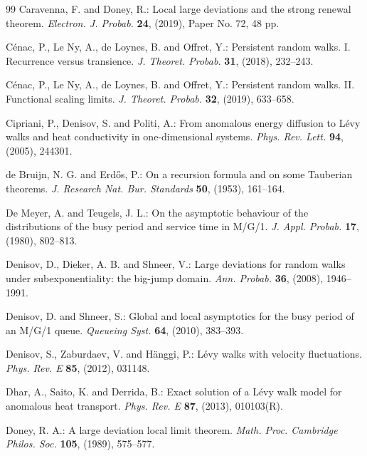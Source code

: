\documentclass[EJP,preprint]{ejpecp}
\theoremstyle{ejpecpbodyit}
\begin{document}
\begin{thebibliography}{99}
 Caravenna, F. and Doney, R.: Local large
  deviations and the strong renewal theorem. \emph{Electron. J. Probab.}
  \textbf{24}, (2019), Paper No. 72, 48 pp. 

 C\'enac, P., Le Ny, A., de Loynes, B. and Offret, Y.:
  Persistent random walks. I. Recurrence versus transience. \emph{J. Theoret.
  Probab.} \textbf{31}, (2018), 232--243. 

 C\'enac, P., Le Ny, A., de Loynes, B. and Offret, Y.:
  Persistent random walks. II. Functional scaling limits. \emph{J. Theoret.
  Probab.} \textbf{32}, (2019), 633--658. 

 Cipriani, P., Denisov, S. and Politi, A.: From anomalous
  energy diffusion to L\'evy walks and heat conductivity in one-dimensional
  systems. \emph{Phys. Rev. Lett.} \textbf{94}, (2005), 244301.

 de Bruijn, N. G. and Erd\H{o}s, P.: On a recursion
  formula and on some Tauberian theorems. \emph{J. Research Nat. Bur.
  Standards} \textbf{50}, (1953), 161--164. 

 De Meyer, A. and Teugels, J. L.: On the asymptotic behaviour
  of the distributions of the busy period and service time in M/G/1. \emph{J. Appl. Probab.}
  \textbf{17}, (1980), 802--813. 

 Denisov, D., Dieker, A. B. and Shneer, V.: Large deviations
  for random walks under subexponentiality: the big-jump domain. \emph{Ann.
  Probab.} \textbf{36}, (2008), 1946--1991. 

 Denisov, D. and Shneer, S.: Global and local asymptotics for
  the busy period of an M/G/1 queue. \emph{Queueing Syst.} \textbf{64}, (2010), 383--393.

 Denisov, S., Zaburdaev, V. and H\"anggi, P.: L\'evy walks
  with velocity fluctuations. \emph{Phys. Rev. E} \textbf{85}, (2012),
  031148.

 Dhar, A., Saito, K. and Derrida, B.: Exact solution of a
  L\'evy walk model for anomalous heat transport. \emph{Phys. Rev. E}
  \textbf{87}, (2013), 010103(R).

 Doney, R. A.: A large deviation local limit theorem.
  \emph{Math. Proc. Cambridge Philos. Soc.} \textbf{105}, (1989), 575--577.


\end{thebibliography}
\end{document}
